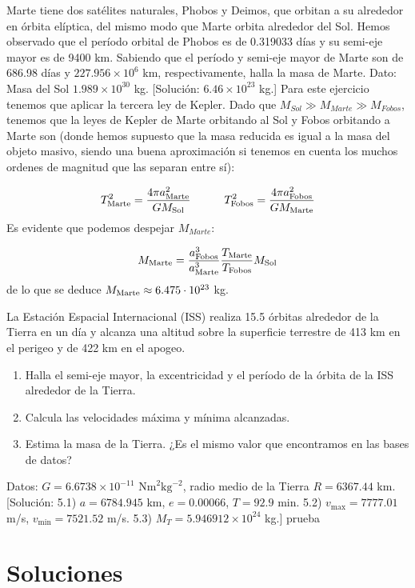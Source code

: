 \begin{texercise}
	Marte tiene dos satélites naturales, Phobos y Deimos, que orbitan a su alrededor en órbita elíptica, del mismo modo que Marte orbita alrededor del Sol. Hemos observado que el período orbital de Phobos es de 0.319033 días y su semi-eje mayor es de 9400 km. Sabiendo que el período y semi-eje mayor de Marte son de 686.98 días y $227.956\times10^6$ km, respectivamente, halla la masa de Marte. Dato: Masa del Sol $1.989 \times 10^{30}$ kg. [Solución: $6.46 \times 10^{23}$ kg.]
	\tcblower 
    Para este ejercicio tenemos que aplicar la tercera ley de Kepler. Dado que $M_{Sol}\gg M_{Marte} \gg M_{Fobos}$, tenemos que la leyes de Kepler de Marte orbitando al Sol y Fobos orbitando a Marte son (donde hemos supuesto que la masa reducida es igual a la masa del objeto masivo, siendo una buena aproximación si tenemos en cuenta los muchos ordenes de magnitud que las separan entre sí):

    \begin{equation}
        T_{\text{Marte}}^2 = \frac{4\pi a_{\text{Marte}}^2}{GM_{\text{Sol}}}   \quad \quad \quad
        T_{\text{Fobos}}^2 = \frac{4\pi a_{\text{Fobos}}^2}{GM_{\text{Marte}}}         
    \end{equation}
    Es evidente que podemos despejar $M_{Marte}$:

    \begin{equation}
        M_{\text{Marte}} = \frac{a_{\text{Fobos}}^3}{a_{\text{Marte}}^3} \frac{T_{\text{Marte}}}{T_{\text{Fobos}}} M_{\text{Sol}}
    \end{equation}
    de lo que se deduce $M_{\text{Marte}}\approx 6.475 \cdot 10^{23}$ kg.
\end{texercise}

\begin{texercise}
	La Estación Espacial Internacional (ISS) realiza 15.5 órbitas alrededor de la Tierra en un día y alcanza una altitud sobre la superficie terrestre de 413 km en el perigeo y de 422 km en el apogeo.
    \begin{enumerate}[label=\alph*)]
        \item Halla el semi-eje mayor, la excentricidad y el período de la órbita de la ISS alrededor de la Tierra.
	    \item Calcula las velocidades máxima y mínima alcanzadas.
	    \item Estima la masa de la Tierra. ¿Es el mismo valor que encontramos en las bases de datos?
    \end{enumerate}
	Datos: $G = 6.6738 \times 10^{-11} \text{ Nm}^2\text{kg}^{-2}$, radio medio de la Tierra $R = 6367.44$ km. [Solución: 5.1) $a = 6784.945$ km, $e = 0.00066$, $T = 92.9$ min. 5.2) $v_{\max} = 7777.01$ m/s, $v_{\min} = 7521.52$ m/s. 5.3) $M_T = 5.946912 \times 10^{24}$ kg.]
	\tcblower prueba
\end{texercise}

\tcbstoprecording

\section{{Soluciones}}

\tcbinputrecords
